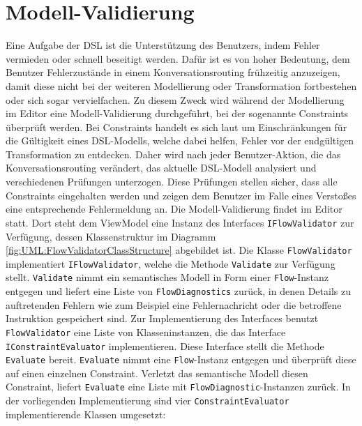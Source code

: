 \section{Modell-Validierung} 
Eine Aufgabe der DSL ist die Unterstützung des Benutzers, indem Fehler vermieden oder schnell beseitigt werden. Dafür ist es von hoher Bedeutung, dem Benutzer Fehlerzustände in einem Konversationsrouting frühzeitig anzuzeigen, damit diese nicht bei der weiteren Modellierung oder Transformation fortbestehen oder sich sogar vervielfachen. Zu diesem Zweck wird während der Modellierung im Editor eine Modell-Validierung durchgeführt, bei der sogenannte Constraints überprüft werden. Bei Constraints handelt es sich laut \cite[S. 82ff, 289ff]{Voelter:13} um Einschränkungen für die Gültigkeit eines DSL-Modells, welche dabei helfen, Fehler vor der endgültigen Transformation zu entdecken. Daher wird nach jeder Benutzer-Aktion, die das Konversationsrouting verändert, das aktuelle DSL-Modell analysiert und verschiedenen Prüfungen unterzogen. Diese Prüfungen stellen sicher, dass alle Constraints eingehalten werden und zeigen dem Benutzer im Falle eines Verstoßes eine entsprechende Fehlermeldung an.
\newline
Die Modell-Validierung findet im Editor statt. Dort steht dem ViewModel eine Instanz des Interfaces \texttt{IFlowValidator} zur Verfügung, dessen Klassenstruktur im Diagramm \ref{fig:UML:FlowValidatorClassStructure} abgebildet ist. Die Klasse \texttt{FlowValidator} implementiert \texttt{IFlowValidator}, welche die Methode \texttt{Validate} zur Verfügung stellt. \texttt{Validate} nimmt ein semantisches Modell in Form einer \texttt{Flow}-Instanz entgegen und liefert eine Liste von \texttt{FlowDiagnostics} zurück, in denen Details zu auftretenden Fehlern wie zum Beispiel eine Fehlernachricht oder die betroffene Instruktion gespeichert sind. Zur Implementierung des Interfaces benutzt \texttt{FlowValidator} eine Liste von Klasseninstanzen, die das Interface \texttt{IConstraintEvaluator} implementieren. Diese Interface stellt die Methode \texttt{Evaluate} bereit. \texttt{Evaluate} nimmt eine \texttt{Flow}-Instanz entgegen und überprüft diese auf einen einzelnen Constraint. Verletzt das semantische Modell diesen Constraint, liefert \texttt{Evaluate} eine Liste mit \texttt{FlowDiagnostic}-Instanzen zurück. In der vorliegenden Implementierung sind vier \texttt{ConstraintEvaluator} implementierende Klassen umgesetzt: 
